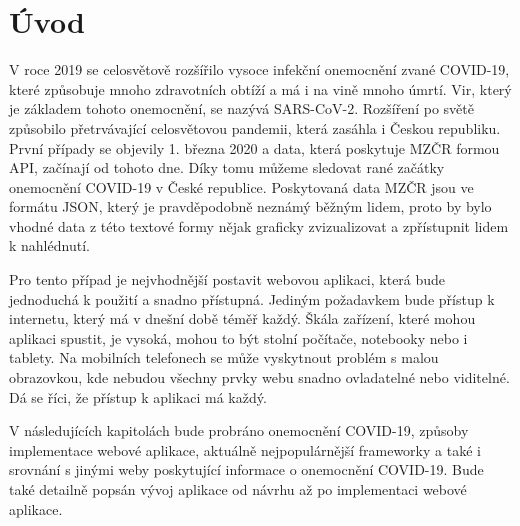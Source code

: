 \chapter{Úvod}
\label{sec:Introduction}

V roce 2019 se celosvětově rozšířilo vysoce infekční onemocnění zvané COVID-19, které způsobuje mnoho zdravotních obtíží a má i na vině mnoho úmrtí. Vir, který je základem tohoto onemocnění, se nazývá SARS-CoV-2. Rozšíření po světě způsobilo přetrvávající celosvětovou pandemii, která zasáhla i Českou republiku. První případy se objevily 1. března 2020 a data, která poskytuje MZČR formou API, začínají od tohoto dne. Díky tomu můžeme sledovat rané začátky onemocnění COVID-19 v České republice. Poskytovaná data MZČR jsou ve formátu JSON, který je pravděpodobně neznámý běžným lidem, proto by bylo vhodné data z této textové formy nějak graficky zvizualizovat a zpřístupnit lidem k nahlédnutí.

Pro tento případ je nejvhodnější postavit webovou aplikaci, která bude jednoduchá k použití a snadno přístupná. Jediným požadavkem bude přístup k internetu, který má v dnešní době téměř každý. Škála zařízení, které mohou aplikaci spustit, je vysoká, mohou to být stolní počítače, notebooky nebo i tablety. Na mobilních telefonech se může vyskytnout problém s malou obrazovkou, kde nebudou všechny prvky webu snadno ovladatelné nebo viditelné. Dá se říci, že přístup k aplikaci má každý.

V následujících kapitolách bude probráno onemocnění COVID-19, způsoby implementace webové aplikace, aktuálně nejpopulárnější frameworky a také i srovnání s jinými weby poskytující informace o onemocnění COVID-19. Bude také detailně popsán vývoj aplikace od návrhu až po implementaci webové aplikace.

\endinput